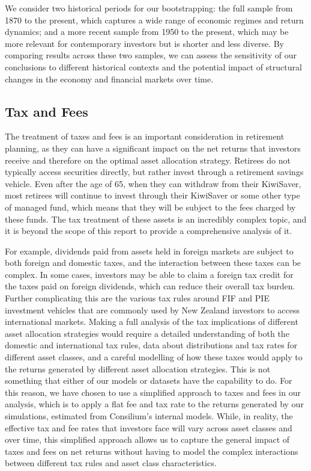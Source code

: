 \documentclass[11pt]{article}
\begin{document}
We consider two historical periods for our bootstrapping: the full sample from 1870 to the present, which captures a wide range of economic regimes and return dynamics; and a more recent sample from 1950 to the present, which may be more relevant for contemporary investors but is shorter and less diverse. By comparing results across these two samples, we can assess the sensitivity of our conclusions to different historical contexts and the potential impact of structural changes in the economy and financial markets over time.


\subsection{Tax and Fees}

The treatment of taxes and fees is an important consideration in retirement planning, as they can have a significant impact on the net returns that investors receive and therefore on the optimal asset allocation strategy. Retirees do not typically access securities directly, but rather invest through a retirement savings vehicle. Even after the age of 65, when they can withdraw from their KiwiSaver, most retirees will continue to invest through their KiwiSaver or some other type of managed fund, which means that they will be subject to the fees charged by these funds. The tax treatment of these assets is an incredibly complex topic, and it is beyond the scope of this report to provide a comprehensive analysis of it. 

For example, dividends paid from assets held in foreign markets are subject to both foreign and domestic taxes, and the interaction between these taxes can be complex. In some cases, investors may be able to claim a foreign tax credit for the taxes paid on foreign dividends, which can reduce their overall tax burden. Further complicating this are the various tax rules around FIF and PIE investment vehicles that are commonly used by New Zealand investors to access international markets. Making a full analysis of the tax implications of different asset allocation strategies would require a detailed understanding of both the domestic and international tax rules, data about distributions and tax rates for different asset classes, and a careful modelling of how these taxes would apply to the returns generated by different asset allocation strategies. This is not something that either of our models or datasets have the capability to do. For this reason, we have chosen to use a simplified approach to taxes and fees in our analysis, which is to apply a flat fee and tax rate to the returns generated by our simulations, estimated from Consilium's internal models. While, in reality, the effective tax and fee rates that investors face will vary across asset classes and over time, this simplified approach allows us to capture the general impact of taxes and fees on net returns without having to model the complex interactions between different tax rules and asset class characteristics.
\end{document}
